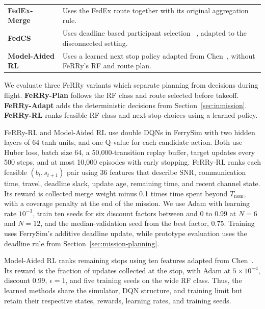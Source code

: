\documentclass[conference]{IEEEtran}
\newcommand{\sysname}{FeRRy}
\begin{document}
\begin{table}[t]
\begin{tabular}{p{} p{}}
\textbf{FedEx-Merge} &
Uses the FedEx route together with its original aggregation rule. \\

\textbf{FedCS} &
Uses deadline based participant selection ~\cite{nishio2019client}, adapted to the disconnected setting. \\

\textbf{Model-Aided RL} &
Uses a learned next stop policy adapted from
Chen~\cite{chen2023model}, without \sysname{}'s RF and route plan. \\

\hline
\end{tabular}
\end{table}

We evaluate three \sysname{} variants which separate planning from decisions during flight. \textbf{\sysname{}-Plan} follows the RF class and route selected before takeoff. \textbf{\sysname{}-Adapt} adds the
deterministic decisions from Section~\ref{sec:inmission}.
\textbf{\sysname{}-RL} ranks feasible RF-class
and next-stop choices using a learned policy.

\sysname{}-RL and Model-Aided RL use double DQNs in FerrySim with two hidden
layers of 64 tanh units, and one Q-value for each candidate action. Both use Huber loss, batch size 64, a 50,000-transition replay
buffer, target updates every 500 steps, and at most 10,000 episodes with early
stopping. \sysname{}-RL ranks each feasible $(b_t,s_{t+1})$ pair using 36 features
that describe SNR, communication time, travel, deadline slack, update age, remaining time,
and recent channel state. Its reward is collected merge weight minus 0.1 times
time spent beyond \(T_{\mathrm{nom}}\), with a coverage penalty at the end of the mission. We use Adam with learning rate
\(10^{-3}\), train ten seeds for six discount factors between and 0 to 0.99 at \(N=6\) and
\(N=12\), and the median-validation seed from the best factor, 0.75. Training
uses FerrySim's additive deadline update, while prototype evaluation uses the deadline rule from
Section~\ref{sec:mission-planning}.

Model-Aided RL ranks remaining stops using ten features adapted from
Chen~\cite{chen2023model}. Its reward is the fraction of updates collected at
the stop, with Adam at \(5\times10^{-4}\), discount 0.99,
\(\epsilon=1\), and five training seeds on the wide RF class. Thus, the learned methods
share the simulator, DQN structure, and training limit but retain their
respective states, rewards, learning rates, and training seeds.
\end{document}
